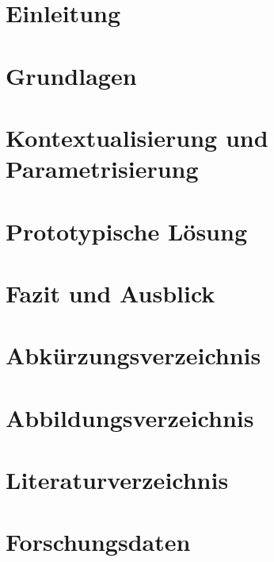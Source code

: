 \documentclass[headings=small,a4paper,11pt,oneside]{scrreprt}
\begin{document}
\singlespacing

\maketitle

\singlespacing
\tableofcontents
\restoregeometry

\singlespacing
\chapter{Einleitung}


\singlespacing 
\chapter{Grundlagen}


\singlespacing
\chapter{Kontextualisierung und Parametrisierung}


\singlespacing 
\chapter{Prototypische Lösung}


\singlespacing 
\chapter{Fazit und Ausblick}


\singlespacing 
\appendix
\chapter{Abkürzungsverzeichnis}

\chapter{Abbildungsverzeichnis}



\chapter{Literaturverzeichnis}


\chapter{Forschungsdaten}

\end{document}
